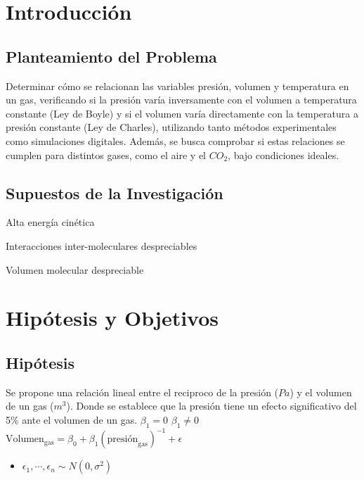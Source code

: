 \documentclass[12pt,a4paper]{config/myConfig}
\begin{document}
\section{Introducción}
\label{sec:INTRODUCCION}

\subsection{Planteamiento del Problema}
\label{sec:PLANTAMIENTO-PROBLEMA}

Determinar cómo se relacionan las variables presión, volumen y temperatura en un gas, verificando si la presión varía inversamente con el volumen a temperatura constante (Ley de Boyle) y si el volumen varía directamente con la temperatura a presión constante (Ley de Charles), utilizando tanto métodos experimentales como simulaciones digitales. Además, se busca comprobar si estas relaciones se cumplen para distintos gases, como el aire y el $CO_2$, bajo condiciones ideales. 

\subsection{Supuestos de la Investigación}
\label{sec:SUPUESTOS}

\begin{supuestos}
  \item \label{su:uno} Alta energía cinética
  \item \label{su:dos} Interacciones inter-moleculares despreciables
  \item \label{su:tres} Volumen molecular despreciable
\end{supuestos}
  
\section{Hipótesis y Objetivos}
\label{sec:HIPOTESIS-OBJECTIVOS}

\subsection{Hipótesis}
\label{sec:HIPOTESIS}


\begin{hipotesis}
  {Se propone una relación lineal entre el reciproco de la presión ($Pa$) y el volumen de un gas ($m^3$). Donde se establece que la presión tiene un efecto significativo del 5\% ante el volumen de un gas.}
  {$\beta_1 = 0$} %
  {$\beta_1 \neq 0$} %
  {$\text{Volumen}_{\text{gas}} = \beta_0 + \beta_1(\text{presión}_{\text{gas}})^{-1} + \epsilon$} %
  {
  \begin{itemize}
      \item $\epsilon_1,\cdots, \epsilon_n \sim N(0,\sigma^2)$
    \end{itemize}} %
\end{hipotesis}
\end{document}
